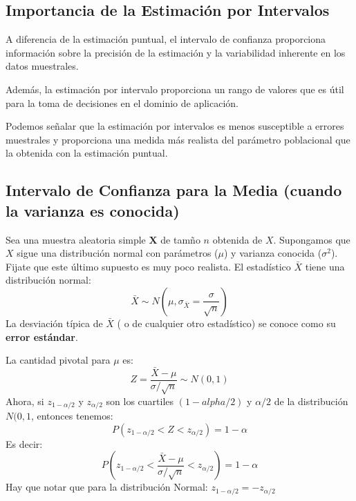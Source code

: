 \documentclass[
  letterpaper,
  DIV=11,
  numbers=noendperiod]{scrreprt}
\begin{document}
\hypertarget{importancia-de-la-estimaciuxf3n-por-intervalos}{%
\subsection{Importancia de la Estimación por
Intervalos}\label{importancia-de-la-estimaciuxf3n-por-intervalos}}

A diferencia de la estimación puntual, el intervalo de confianza
proporciona información sobre la precisión de la estimación y la
variabilidad inherente en los datos muestrales.

Además, la estimación por intervalo proporciona un rango de valores que
es útil para la toma de decisiones en el dominio de aplicación.

Podemos señalar que la estimación por intervalos es menos susceptible a
errores muestrales y proporciona una medida más realista del parámetro
poblacional que la obtenida con la estimación puntual.

\hypertarget{intervalo-de-confianza-para-la-media-cuando-la-varianza-es-conocida}{%
\subsection{Intervalo de Confianza para la Media (cuando la varianza es
conocida)}\label{intervalo-de-confianza-para-la-media-cuando-la-varianza-es-conocida}}

Sea una muestra aleatoria simple \(\mathbf{X}\) de tamño \(n\) obtenida
de \(X\). Supongamos que \(X\) sigue una distribución normal con
parámetros (\(\mu\)) y varianza conocida (\(\sigma^2\)). Fijate que este
último supuesto es muy poco realista. El estadístico \(\bar{X}\) tiene
una distribución normal: \[
\bar{X} \sim N \left( \mu,\sigma_{\bar{X}}=\frac{\sigma}{\sqrt{n}}\right )
\] La desviación típica de \(\bar{X}\) ( o de cualquier otro
estadístico) se conoce como su \textbf{error estándar}.

La cantidad pivotal para \(\mu\) es: \[
Z=\frac{\bar{X}-\mu}{\sigma/\sqrt{n}} \sim N \left( 0,1 \right )
\] Ahora, si \(z_{1-\alpha/2}\) y \(z_{\alpha/2}\) son los cuartiles
\((1-alpha/2)\) y \(\alpha/2\) de la distribución \(N(0,1\), entonces
tenemos: \[
P(z_{1-\alpha/2}<Z<z_{\alpha/2})=1-\alpha
\] Es decir: \[
P\left (z_{1-\alpha/2}<\frac{\bar{X}-\mu}{\sigma/\sqrt{n}}<z_{\alpha/2} \right)=1-\alpha
\] Hay que notar que para la distribución Normal:
\(z_{1-\alpha/2}=-z_{\alpha/2}\)
\end{document}
